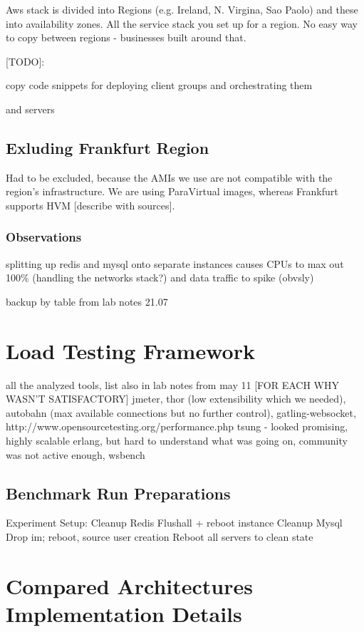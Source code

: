 \documentclass{uvamscse}
\begin{document}
Aws stack is divided into Regions (e.g. Ireland, N. Virgina, Sao Paolo) and these into availability zones. All the service stack you set up for a region. No easy way to copy between regions - businesses built around that.

[TODO]:

copy code snippets for deploying client groups and orchestrating them 

and servers

\subsection{Exluding Frankfurt Region}\label{Exluding Frankfurt Region}

Had to be excluded, because the AMIs we use are not compatible with the region's infrastructure. We are using ParaVirtual images, whereas Frankfurt supports HVM [describe with sources].

\subsubsection{Observations}

splitting up redis and mysql onto separate instances causes CPUs to max out 100\% (handling the networks stack?) and data traffic to spike (obvsly)

backup by table from lab notes 21.07

\section{Load Testing Framework}\label{Load Testing Framework}
all the analyzed tools, list also in lab notes from may 11 [FOR EACH WHY WASN'T SATISFACTORY]
jmeter, thor (low extensibility which we needed), autobahn (max available connections but no further control),
gatling-websocket, http://www.opensourcetesting.org/performance.php
tsung - looked promising, highly scalable erlang, but hard to understand what was going on, community was not active enough, wsbench


\subsection{Benchmark Run Preparations}

Experiment Setup:
Cleanup Redis
Flushall + reboot instance
Cleanup Mysql
Drop im; reboot, source user creation
Reboot all servers to clean state


\section{Compared Architectures Implementation Details}\label{Compared Architectures Implementation Details}
\end{document}

